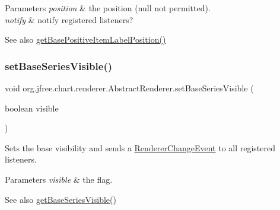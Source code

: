 \begin{DoxyParams}{Parameters}
{\em position} & the position ({\ttfamily null} not permitted). \\
\hline
{\em notify} & notify registered listeners?\\
\hline
\end{DoxyParams}
\begin{DoxySeeAlso}{See also}
\mbox{\hyperlink{classorg_1_1jfree_1_1chart_1_1renderer_1_1_abstract_renderer_ab6f209ffdfae7e859ba7c047f3160630}{get\+Base\+Positive\+Item\+Label\+Position()}} 
\end{DoxySeeAlso}
\mbox{\label{classorg_1_1jfree_1_1chart_1_1renderer_1_1_abstract_renderer_af5e2fb8863761c1e74ff957a7c13ba78}} 
\subsubsection{\texorpdfstring{set\+Base\+Series\+Visible()}{setBaseSeriesVisible()}\hspace{0.1cm}{\footnotesize\ttfamily [1/2]}}
{\footnotesize\ttfamily void org.\+jfree.\+chart.\+renderer.\+Abstract\+Renderer.\+set\+Base\+Series\+Visible (\begin{DoxyParamCaption}\item[{boolean}]{visible }\end{DoxyParamCaption})}

Sets the base visibility and sends a \mbox{\hyperlink{}{Renderer\+Change\+Event}} to all registered listeners.


\begin{DoxyParams}{Parameters}
{\em visible} & the flag.\\
\hline
\end{DoxyParams}
\begin{DoxySeeAlso}{See also}
\mbox{\hyperlink{classorg_1_1jfree_1_1chart_1_1renderer_1_1_abstract_renderer_a854c652505643472b823747703d8b3ca}{get\+Base\+Series\+Visible()}} 
\end{DoxySeeAlso}
\mbox{\label{classorg_1_1jfree_1_1chart_1_1renderer_1_1_abstract_renderer_a24e78cc47b075c08855425bdfd8d5def}} 
